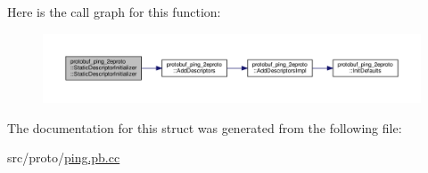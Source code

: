 Here is the call graph for this function\+:
\nopagebreak
\begin{figure}[H]
\begin{center}
\leavevmode
\includegraphics[width=350pt]{structprotobuf__ping__2eproto_1_1_static_descriptor_initializer_a36f6ff12a1a09dad25ca353f67c22d87_cgraph}
\end{center}
\end{figure}




The documentation for this struct was generated from the following file\+:\begin{DoxyCompactItemize}
\item 
src/proto/\hyperlink{ping_8pb_8cc}{ping.\+pb.\+cc}\end{DoxyCompactItemize}
